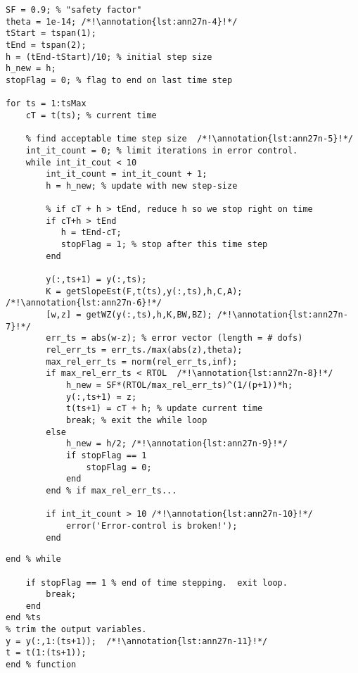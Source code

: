 \begin{lstlisting}[style=myMatlab,name=lec27n-1]
SF = 0.9; % "safety factor"
theta = 1e-14; /*!\annotation{lst:ann27n-4}!*/
tStart = tspan(1);
tEnd = tspan(2);
h = (tEnd-tStart)/10; % initial step size
h_new = h;
stopFlag = 0; % flag to end on last time step

for ts = 1:tsMax
    cT = t(ts); % current time
    
    % find acceptable time step size  /*!\annotation{lst:ann27n-5}!*/
    int_it_count = 0; % limit iterations in error control.
    while int_it_cout < 10
        int_it_count = int_it_count + 1;
        h = h_new; % update with new step-size
        
        % if cT + h > tEnd, reduce h so we stop right on time
        if cT+h > tEnd 
           h = tEnd-cT; 
           stopFlag = 1; % stop after this time step
        end
        
        y(:,ts+1) = y(:,ts);
        K = getSlopeEst(F,t(ts),y(:,ts),h,C,A); /*!\annotation{lst:ann27n-6}!*/
        [w,z] = getWZ(y(:,ts),h,K,BW,BZ); /*!\annotation{lst:ann27n-7}!*/
        err_ts = abs(w-z); % error vector (length = # dofs)
        rel_err_ts = err_ts./max(abs(z),theta);
        max_rel_err_ts = norm(rel_err_ts,inf);
        if max_rel_err_ts < RTOL  /*!\annotation{lst:ann27n-8}!*/
            h_new = SF*(RTOL/max_rel_err_ts)^(1/(p+1))*h;  
            y(:,ts+1) = z; 
            t(ts+1) = cT + h; % update current time   
            break; % exit the while loop
        else
            h_new = h/2; /*!\annotation{lst:ann27n-9}!*/
            if stopFlag == 1
                stopFlag = 0;
            end
        end % if max_rel_err_ts...

        if int_it_count > 10 /*!\annotation{lst:ann27n-10}!*/
            error('Error-control is broken!'); 
        end
\end{lstlisting}
\setcounter{lstannotation}{0}
\begin{lstlisting}[style=myMatlab,name=lec27n-1]      
    end % while 
        
    if stopFlag == 1 % end of time stepping.  exit loop.
        break;
    end
end %ts
% trim the output variables.
y = y(:,1:(ts+1));  /*!\annotation{lst:ann27n-11}!*/
t = t(1:(ts+1));
end % function
\end{lstlisting}
